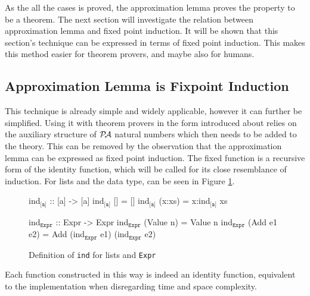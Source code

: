 As the all the cases is proved, the approximation lemma proves the
property to be a theorem. The next section will investigate the
relation between approximation lemma and fixed point induction. It
will be shown that this section's technique can be expressed in terms
of fixed point induction. This makes this method easier for theorem
provers, and maybe also for humans.

\subsection{Approximation Lemma is Fixpoint Induction}

This technique is already simple and widely applicable, however it can
further be simplified. Using it with theorem provers in the form
introduced about relies on the auxiliary structure of $\mathcal{P\!A}$ natural
numbers which then needs to be added to the theory. This can be
removed by the observation that the approximation lemma can be
expressed as fixed point induction. The fixed function is a recursive
form of the identity function, which will be called  for its
close resemblance of induction. For lists and the  data type,
 can be seen in Figure \ref{code:ind}.

\begin{figure}[h!]
\centering
\begin{minipage}[b]{5cm}
\begin{code}[mathescape]
ind$_{\texttt{[a]}}$ :: [a] -> [a]
ind$_{\texttt{[a]}}$ [] = []
ind$_{\texttt{[a]}}$ (x:xs) = x:ind$_{\texttt{[a]}}$ xs
\end{code}
\end{minipage}
\hspace{10pt}
\begin{minipage}[b]{8.3cm}
\begin{code}[mathescape]
ind$_{\texttt{Expr}}$ :: Expr -> Expr
ind$_{\texttt{Expr}}$ (Value n) = Value n
ind$_{\texttt{Expr}}$ (Add e1 e2) = Add (ind$_{\texttt{Expr}}$ e1) (ind$_{\texttt{Expr}}$ e2)
\end{code}
\label{code:approx}
\end{minipage}
\caption{Definition of \texttt{ind} for lists and \texttt{Expr}
\label{code:ind}
}
\end{figure}

Each  function constructed in this way is indeed an identity
function, equivalent to the implementation  when
disregarding time and space complexity.

